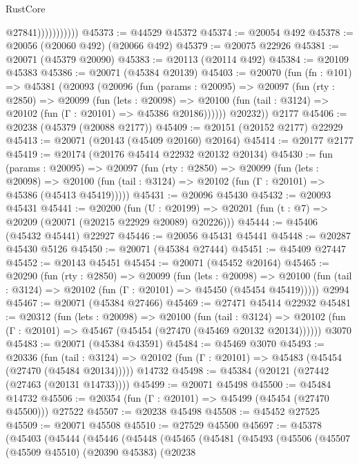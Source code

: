 \begin{lexlean}{RustCore}
\begin{coremodule}
                          @27841)))))))))))
@45373 := @44529 @45372
@45374 := @20054 @492
@45378 := @20056 (@20060 @492) (@20066 @492)
@45379 := @20075 @22926
@45381 := @20071 (@45379 @20090)
@45383 := @20113 (@20114 @492)
@45384 := @20109 @45383
@45386 := @20071 (@45384 @20139)
@45403 := @20070
    (fun (fn : @101) =>
    @45381
      (@20093
        (@20096
          (fun (params : @20095) =>
          @20097
            (fun (rty : @2850) =>
            @20099
              (fun (lets : @20098) =>
              @20100 (fun (tail : @3124) => @20102 (fun (Γ : @20101) => @45386 @20186))))))
        @20232))
    @2177
@45406 := @20238 (@45379 (@20088 @2177))
@45409 := @20151 (@20152 @2177) @22929
@45413 := @20071 (@20143 (@45409 @20160) @20164)
@45414 := @20177 @2177
@45419 := @20174 (@20176 @45414 @22932 @20132 @20134)
@45430 := fun (params : @20095) =>
  @20097
    (fun (rty : @2850) =>
    @20099
      (fun (lets : @20098) =>
      @20100 (fun (tail : @3124) => @20102 (fun (Γ : @20101) => @45386 (@45413 @45419)))))
@45431 := @20096 @45430
@45432 := @20093 @45431
@45441 := @20200
    (fun (U : @20199) => @20201 (fun (t : @7) => @20209 (@20071 (@20215 @22929 @20089) @20226)))
@45444 := @45406 (@45432 @45441) @22927
@45446 := @20056 @45431 @45441
@45448 := @20287 @45430 @5126
@45450 := @20071 (@45384 @27444)
@45451 := @45409 @27447
@45452 := @20143 @45451
@45454 := @20071 (@45452 @20164)
@45465 := @20290
    (fun (rty : @2850) =>
    @20099
      (fun (lets : @20098) =>
      @20100 (fun (tail : @3124) => @20102 (fun (Γ : @20101) => @45450 (@45454 @45419)))))
    @2994
@45467 := @20071 (@45384 @27466)
@45469 := @27471 @45414 @22932
@45481 := @20312
    (fun (lets : @20098) =>
    @20100
      (fun (tail : @3124) =>
      @20102 (fun (Γ : @20101) => @45467 (@45454 (@27470 (@45469 @20132 @20134))))))
    @3070
@45483 := @20071 (@45384 @43591)
@45484 := @45469 @3070
@45493 := @20336
    (fun (tail : @3124) => @20102 (fun (Γ : @20101) => @45483 (@45454 (@27470 (@45484 @20134)))))
    @14732
@45498 := @45384 (@20121 (@27442 (@27463 (@20131 @14733))))
@45499 := @20071 @45498
@45500 := @45484 @14732
@45506 := @20354 (fun (Γ : @20101) => @45499 (@45454 (@27470 @45500))) @27522
@45507 := @20238 @45498
@45508 := @45452 @27525
@45509 := @20071 @45508
@45510 := @27529 @45500
@45697 := @45378
    (@45403
      (@45444
        (@45446
          (@45448
            (@45465
              (@45481
                (@45493
                  (@45506
                    (@45507
                      (@45509 @45510)
                      (@20390 @45383)
                      (@20238

\end{coremodule}
\end{lexlean}
